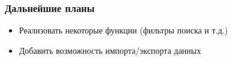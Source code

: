 \documentclass[aspectratio=169]{beamer}
\begin{document}


\begin{frame}
	\frametitle{Дальнейшие планы}
	\begin{itemize}
		\item Реализовать некоторые функции (фильтры поиска и т.д.)
		\item Добавить возможность импорта/экспорта данных
	\end{itemize}

\end{frame}



\end{document}
